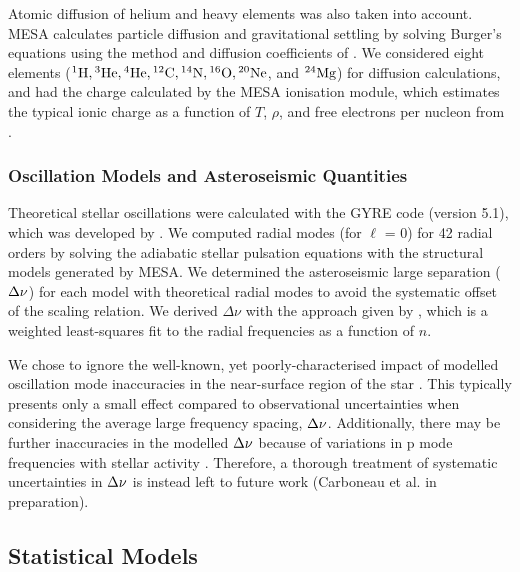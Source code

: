 Atomic diffusion of helium and heavy elements was also taken into account. \textsc{MESA} calculates particle diffusion and gravitational settling by solving Burger's equations using the method
and diffusion coefficients of \citet{Thoul.Bahcall.ea1994}. We considered eight elements (${}^1{\rm H}, {}^3{\rm He}, {}^4{\rm He}, {}^{12}{\rm C}, {}^{14}{\rm N}, {}^{16}{\rm O}, {}^{20}{\rm Ne}$, and ${}^{24}{\rm Mg}$)
for diffusion calculations, and had the charge calculated by the \textsc{MESA} ionisation module, which estimates the typical ionic charge as a function of $T$, $\rho$, and free electrons per nucleon from \citet{Paquette.Pelletier.ea1986}.

\subsubsection{Oscillation Models and Asteroseismic Quantities}\label{subsec:seismo_model}

Theoretical stellar oscillations were calculated with the \textsc{GYRE} code (version 5.1), which was developed by \citet{Townsend.Teitler2013}. We computed radial modes (for $\ell$ = 0) for 42 radial orders by solving the adiabatic stellar pulsation equations with the structural models generated by \textsc{MESA}. We determined the asteroseismic large separation (${\Delta\nu}$) for each model with theoretical radial modes to avoid the systematic offset of the scaling relation. We derived $\Delta \nu$ with the approach given by \citet{White.Bedding.ea2011}, which is a weighted least-squares fit to the radial frequencies as a function of $n$.

We chose to ignore the well-known, yet poorly-characterised impact of modelled oscillation mode inaccuracies in the near-surface region of the star \citep{Kjeldsen.Bedding.ea2008, Ball.Gizon2014, Sonoi.Samadi.ea2015}. This typically presents only a small effect compared to observational uncertainties when considering the average large frequency spacing, ${\Delta\nu}$. Additionally, there may be further inaccuracies in the modelled ${\Delta\nu}$ because of variations in p mode frequencies with stellar activity \citep{Chaplin.Elsworth.ea2007, Garcia.Mathur.ea2010, Kiefer.Schad.ea2017}. Therefore, a thorough treatment of systematic uncertainties in ${\Delta\nu}$ is instead left to future work (Carboneau et al. in preparation). %

\subsection{Statistical Models}\label{sec:hbm}

